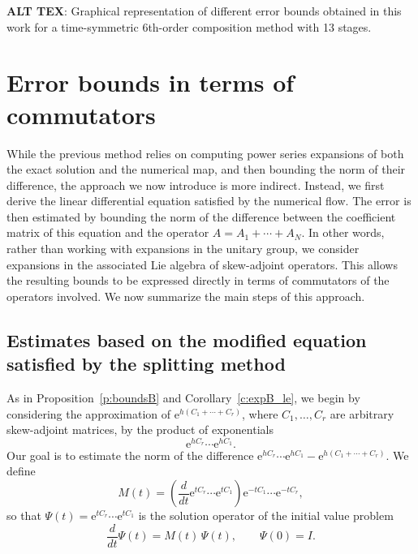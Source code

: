 \documentclass[11pt]{article}
\newcommand{\e}{\ensuremath{\mathrm{e}}}
\begin{document}
\textbf{ALT TEX}: Graphical representation of different error bounds obtained in this work for a time-symmetric 6th-order composition method with 13 stages.

  
  
\section{Error bounds in terms of commutators}

While the previous method relies on computing power series expansions of both the exact solution and the numerical map, and then bounding the norm of their difference, the approach we now introduce is more indirect. Instead, we first derive the linear differential equation satisfied by the numerical flow. The error is then estimated by bounding the norm of the difference between the coefficient matrix of this equation and the operator $A = A_1 + \cdots + A_N$. 
In other words, rather than working with expansions in the unitary group, we consider expansions in the associated Lie algebra of skew-adjoint operators. This allows the resulting bounds to be expressed directly in terms of commutators of the operators involved. We now summarize the main steps of this approach.



\subsection{Estimates based on the modified equation satisfied by the splitting method}

As in Proposition~\ref{p:boundsB} and Corollary~\ref{c:expB_le}, we begin by considering the approximation of  $\e^{h (C_1+ \cdots + C_r)}$, where $C_1,\ldots,C_r$ are arbitrary skew-adjoint matrices, by the product of exponentials
\[
\e^{h C_r}\cdots \e^{h C_1}.
\]
Our goal is to estimate the norm of the difference
$\e^{h C_r}\cdots \e^{h C_1} - \e^{h (C_1+ \cdots + C_r)}$. We define 
\begin{equation}
\label{eq:M(t)}
M(t) = \left(\frac{d}{dt} \e^{t C_r}\cdots \e^{t C_1} \right) \e^{-t C_1}\cdots \e^{-t C_r}, 
\end{equation}
so that $\Psi(t)=\e^{t C_r}\cdots \e^{t C_1}$ is the solution operator of the initial value problem
\begin{equation} \label{modif1}
  \frac{d }{dt} \Psi(t) = M(t) \, \Psi(t), \qquad \Psi(0) = I.
\end{equation}
\end{document}
